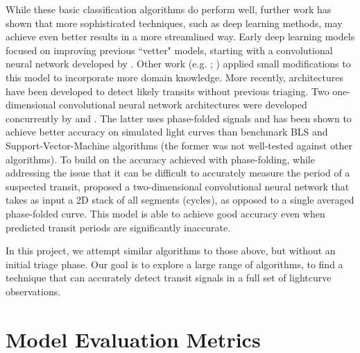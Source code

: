 \documentclass{article}
\begin{document}
While these basic classification algorithms do perform well, further work has shown that more sophisticated techniques, such as deep learning methods, may achieve even better results in a more streamlined way. Early deep learning models focused on improving previous ``vetter" models, starting with a convolutional neural network developed by \cite{Shallue_2018}. Other work (e.g. \citealp{Ansdell_2018};  \citealp{Yu_2019}) applied small modifications to this model to incorporate more domain knowledge.  More recently, architectures have been developed to detect likely transits without previous triaging. Two one-dimensional convolutional neural network architectures were developed concurrently by \cite{Zucker2018} and \cite{Pearson2018}. The latter uses phase-folded signals and has been shown to achieve better accuracy on simulated light curves than benchmark BLS and Support-Vector-Machine algorithms (the former was not well-tested against other algorithms). To build on the accuracy achieved with phase-folding, while addressing the issue that it can be difficult to accurately measure the period of a suspected transit,
\cite{Chintarungruangchai_2019} proposed a two-dimensional convolutional neural network that takes as input a 2D stack of all segments (cycles), as opposed to a single averaged phase-folded curve.  This model is able to achieve good accuracy even when predicted transit periods are significantly inaccurate.

In this project, we attempt similar algorithms to those above, but without an initial triage phase. Our goal is to explore a large range of algorithms, to find a technique that can accurately detect transit signals in a full set of lightcurve observations. 

\section{Model Evaluation Metrics}
\label{sec:evaluation}

\end{document}
